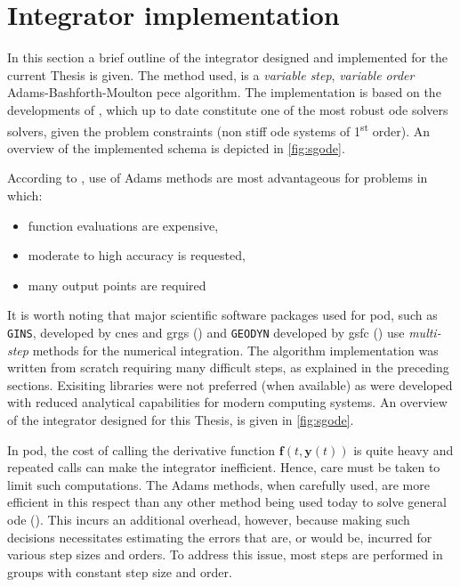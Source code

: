 \section{Integrator implementation}\label{sec:integrator-implementation}

\iffalse
\fi

In this section a brief outline of the integrator designed and implemented for 
the current Thesis is given. The method used, is a \emph{variable step}, 
\emph{variable order} Adams-Bashforth-Moulton \gls{pece} algorithm. The 
implementation is based on the developments of \cite{Shampine1975}, which up to 
date constitute one of the most robust \gls{ode} solvers solvers, given the 
problem constraints (non stiff \gls{ode} systems of 1\textsuperscript{st} order).
An overview of the implemented schema is depicted in \autoref{fig:sgode}.

According to \cite{Shampine1975}, use of Adams methods are most advantageous for 
problems in which:
\begin{itemize}\setlength\itemsep{.3em}
    \item function evaluations are expensive,
    \item moderate to high accuracy is requested,
    \item many output points are required
\end{itemize}

It is worth noting that  major scientific software packages used for \gls{pod}, such
as \texttt{GINS}, developed by \gls{cnes} and \gls{grgs} (\cite{Gins2013}) and 
\texttt{GEODYN} developed by \gls{gsfc} (\cite{Geodyn2015}) use \emph{multi-step} 
methods for the numerical integration. The algorithm implementation was written 
from scratch requiring many difficult steps, as explained in the preceding sections. 
Exisiting libraries were not preferred (when available) as were developed with 
reduced analytical capabilities for modern computing systems. An overview of the 
integrator designed for this Thesis, is given in \autoref{fig:sgode}. 

In \gls{pod}, the cost of calling the derivative function $\bm{f}(t, \bm{y}(t))$ 
is quite heavy and repeated calls can make the integrator inefficient. Hence, care 
must be taken to limit such computations. The Adams methods, when carefully used, 
are more efficient in this respect than any other method being used today to 
solve general \gls{ode} (\cite{Shampine1975}). This incurs an additional overhead,
however, because making such decisions necessitates estimating the errors that 
are, or would be, incurred for various step sizes and orders. To address this 
issue, most steps are performed in groups with constant step size and order.

